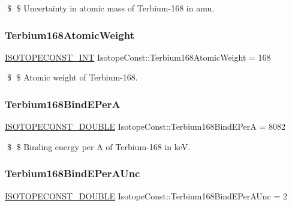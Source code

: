 \$ \$ Uncertainty in atomic mass of Terbium-\/168 in amu. \mbox{\label{group___isotope_const-_terbium-_tb168_ga1775651ef6b207f294fa8699eb098224}} 
\subsubsection{\texorpdfstring{Terbium168\+Atomic\+Weight}{Terbium168AtomicWeight}}
{\footnotesize\ttfamily \mbox{\hyperlink{group___isotope_const-_macros_ga5f18360b3e99483a35c32d789e62621c}{I\+S\+O\+T\+O\+P\+E\+C\+O\+N\+S\+T\+\_\+\+I\+NT}} Isotope\+Const\+::\+Terbium168\+Atomic\+Weight = 168}

\$ \$ Atomic weight of Terbium-\/168. \mbox{\label{group___isotope_const-_terbium-_tb168_ga817dd43442b309b5219c7ba9a2afcaf2}} 
\subsubsection{\texorpdfstring{Terbium168\+Bind\+E\+PerA}{Terbium168BindEPerA}}
{\footnotesize\ttfamily \mbox{\hyperlink{group___isotope_const-_macros_ga8f45a7272ce02c0b4c65c44636ed719a}{I\+S\+O\+T\+O\+P\+E\+C\+O\+N\+S\+T\+\_\+\+D\+O\+U\+B\+LE}} Isotope\+Const\+::\+Terbium168\+Bind\+E\+PerA = 8082}

\$ \$ Binding energy per A of Terbium-\/168 in keV. \mbox{\label{group___isotope_const-_terbium-_tb168_ga0b21aab7239b532fc11b2ebc94a650c9}} 
\subsubsection{\texorpdfstring{Terbium168\+Bind\+E\+Per\+A\+Unc}{Terbium168BindEPerAUnc}}
{\footnotesize\ttfamily \mbox{\hyperlink{group___isotope_const-_macros_ga8f45a7272ce02c0b4c65c44636ed719a}{I\+S\+O\+T\+O\+P\+E\+C\+O\+N\+S\+T\+\_\+\+D\+O\+U\+B\+LE}} Isotope\+Const\+::\+Terbium168\+Bind\+E\+Per\+A\+Unc = 2}

